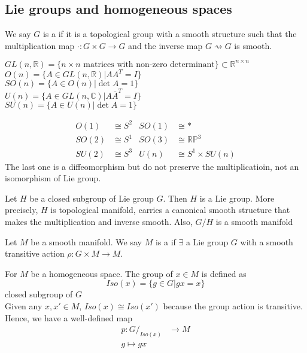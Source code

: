 \subsection{Lie groups and homogeneous spaces}

\begin{definition}
    We say  $ G  $ is a  if it is a topological group with a smooth structure such that the multiplication map $ \cdot : G \times G \to G $ and the inverse map  $ G\rightsquigarrow G  $  is smooth. 
\end{definition}
\begin{example}
     $ GL(n,\mathbb{R})=\{n\times n \text{ matrices with non-zero determinant}\}\subset \mathbb{R}^{n\times n } $\\
      $ O(n)=\{A\in GL(n,\mathbb{R})|AA^T=I\} $\\
       $ SO(n)=\{A\in O(n)|\det A=1\} $\\
        $ U(n)=\{A\in GL(n,\mathbb{C})|A\overline{A}^T=I\} $\\
         $ SU(n)=\{A\in U(n)|\det A=1\} $     
\end{example}
\begin{exercise}
    \begin{align}
        O(1)&\cong S^2 &SO(1)&\cong *\\
            SO(2)&\cong S^1 &SO(3)&\cong \mathbb{R}\mathbb{P}^3 \\
            SU(2)&\cong S^3 &U(n)&\cong S^1\times SU(n)
    \end{align}
    The last one is a diffeomorphism but do not preserve the multiplicatioin, \ie not an isomorphism of Lie group.
\end{exercise}
\begin{theorem}[Carton]
    Let  $ H  $ be a closed subgroup of Lie group  $ G  $. Then  $ H  $ is a Lie group. More precisely,  $ H  $ is topological manifold, carries a canonical smooth structure that makes  the multiplication and inverse smooth. Also,  $ G/H  $ is a smooth manifold
\end{theorem}
\begin{definition}
    Let  $ M  $ be a smooth manifold. We say   $ M  $ is a  if  $ \exists  $ a Lie group 
     $ G  $ with a smooth transitive action $ \rho: G\times M \rightarrow M  $.
\end{definition}
\begin{definition}
    For  $ M  $ be a homogeneous space.
    The  group of  $ x\in M  $ is defined as 
    \[Iso(x)=\{g\in G|gx=x\}\]
    closed subgroup of  $ G $\\
    Given any  $ x,x'\in M  $,  $ Iso(x)\cong Iso(x') $ because the group  action is transitive. \\
    Hence, we have a well-defined map 
    \begin{align}
        p:G/_{Iso(x)}&\rightarrow M \\
        g\mapsto gx
    \end{align}
\end{definition}
